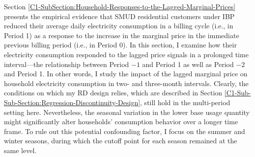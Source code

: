 Section \ref{C1-SubSection:Household-Responses-to-the-Lagged-Marginal-Prices} presents the empirical evidence that SMUD residential customers under IBP reduced their average daily electricity consumption in a billing cycle (i.e., in Period 1) as a response to the increase in the marginal price in the immediate previous billing period (i.e., in Period 0). In this section, I examine how their electricity consumption responded to the lagged price signals in a prolonged time interval---the relationship between Period $-1$ and Period 1 as well as Period $-2$ and Period 1. In other words, I study the impact of the lagged marginal price on household electricity consumption in two- and three-month intervals. Clearly, the conditions on which my RD design relies, which are described in Section \ref{C1-Sub-Sub-Section:Regression-Discontinuity-Design}, still hold in the multi-period setting here. Nevertheless, the seasonal variation in the lower base usage quantity might significantly alter households' consumption behavior over a longer time frame. To rule out this potential confounding factor, I focus on the summer and winter seasons, during which the cutoff point for each season remained at the same level. 


